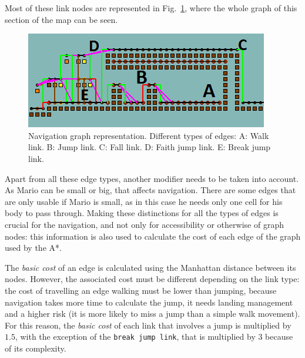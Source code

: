 \documentclass[conference]{IEEEtran}
\begin{document}
Most of these link nodes are represented in Fig.~\ref{fig:trapMapNoted}, where 
the whole graph of this section of the map can be seen.

\begin{figure} [ht]
	\begin{center}
	\includegraphics[scale=0.75]{images/trapMapNoted}
	\caption{Navigation graph representation. Different types of edges: A: Walk link.
	B: Jump link. C: Fall link. D: Faith jump link. E: Break jump link.}
	\label{fig:trapMapNoted}
	\end{center}
\end{figure}



Apart from all these edge types, another modifier needs to be taken into account. As Mario
can be small or big, that affects navigation. There are some edges that are only
usable if Mario is small, as in this case he needs only one cell for his body
to pass through. Making these distinctions for all the types of edges is crucial
for the navigation, and not only for accessibility or otherwise of graph nodes:
this information is also used to calculate the cost of each edge of the
graph used by the A*.

The \textit{basic cost} of an edge is calculated using the Manhattan distance 
between its nodes. However, the associated cost must be 
different depending on the link type: the cost of travelling an edge 
walking must be lower than jumping, because navigation takes more 
time to calculate the jump, it needs landing management and a higher risk 
(it is more likely to miss a jump than a simple walk movement). For this reason, the 
\textit{basic cost} of each link that involves a jump is multiplied by $1.5$, with the 
exception of the \texttt{break jump link}, that is multiplied by $3$ because of 
its complexity.
\end{document}
